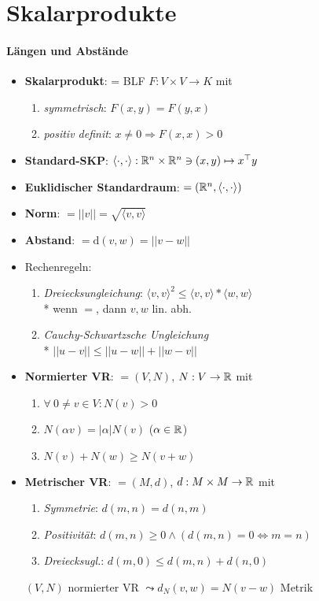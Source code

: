 \section{\label{sec:Skalarprodukte}Skalarprodukte}

\paragraph{Längen und Abstände}
\begin{itemize}
	\item \textbf{Skalarprodukt}: = BLF \( F: V \times V \to K \) mit
		\begin{enumerate}
			\item \emph{symmetrisch}: \( F(x,y) = F(y,x) \)
			\item \emph{positiv definit}: \( x \neq 0 \Rightarrow F(x,x) > 0 \)
		\end{enumerate}
	\item \textbf{Standard-SKP}: \( \langle \cdot, \cdot \rangle: \mathbb{R}^n \times \mathbb{R}^n \ni (x,y) \mapsto x^\top y \)
	\item \textbf{Euklidischer Standardraum}: \( = (\mathbb{R}^n, \langle \cdot, \cdot \rangle) \)
	\item \textbf{Norm}: \( = ||v|| = \sqrt{\langle v,v \rangle} \)
	\item \textbf{Abstand}: \( = \text{d}(v,w) = ||v-w|| \)
	\item Rechenregeln:
		\begin{enumerate}
			\item \emph{Dreiecksungleichung}: \( \langle v,v \rangle^2 \leq \langle v,v \rangle * \langle w,w \rangle \)
				\\*
				wenn \( = \), dann \( v,w \) lin. abh.
			\item \emph{Cauchy-Schwartzsche Ungleichung} \\* \( ||u-v|| \leq ||u-w||+||w-v|| \)
		\end{enumerate}

	\item \textbf{Normierter VR}: \( = (V,N) \), \( N: V \to \mathbb{R} \) mit
		\begin{enumerate}
			\item \( \forall \ 0 \neq v \in V : N(v) > 0 \)
			\item \( N(\alpha v) = |\alpha|N(v) \) (\( \alpha \in \mathbb{R} \))
			\item \( N(v)+N(w) \geq N(v+w) \)
		\end{enumerate}
	\item \textbf{Metrischer VR}: \( =(M,d) \), \( d: M \times M \to \mathbb{R} \) mit
		\begin{enumerate}
			\item \emph{Symmetrie}: \( d(m,n) = d(n,m) \)
			\item \emph{Positivität}: \( d(m,n) \geq 0 \wedge (d(m,n) = 0 \Leftrightarrow m = n) \)
			\item \emph{Dreiecksugl.}: \( d(m,0) \leq d(m,n) + d(n,0) \)
		\end{enumerate}
		\( (V, N) \) normierter VR \( \leadsto d_N(v,w) = N(v-w) \) Metrik


\end{itemize}
